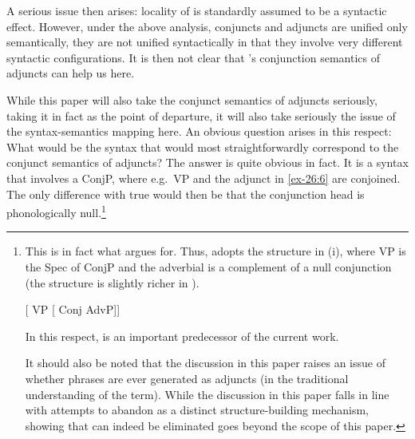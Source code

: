 \documentclass[output=paper]{langsci/langscibook}
\begin{document}
\begin{exe}
\label{ex-26:7}

\label{ex-26:8}
\end{exe}

A serious issue then arises: locality of  is standardly assumed to be a
syntactic effect. However, under the above analysis, conjuncts and adjuncts are
unified only semantically, they are not unified syntactically in that they
involve very different syntactic configurations. It is then not clear that
\citeauthor{Higginbotham1985}’s conjunction semantics of adjuncts can help us
here.

While this paper will also take the conjunct semantics of adjuncts seriously,
taking it in fact as the point of departure, it will also take seriously the
issue of the syntax-semantics mapping here. An obvious question arises in this
respect: What would be the syntax that would most straightforwardly correspond
to the conjunct semantics of adjuncts? The answer is quite obvious in fact. It
is a syntax that involves a ConjP, where e.g.\ VP and the adjunct in \eqref{ex-26:6} are
conjoined. The only difference with true  would then be that the
conjunction head is phonologically null.\footnote{This is in fact what
    \textcite{Progovac1998,Progovac1999} argues for. Thus, \citet{Progovac1998}
    adopts the structure in (i), where VP is the Spec of ConjP and the
    adverbial is a complement of a null conjunction (the structure is slightly
    richer in \citealt{Progovac1999}).

    \begin{exe}
         {}[ VP [ Conj AdvP]]
    \end{exe}

    \noindent In this respect, \textcite{Progovac1998,Progovac1999} is an important
    predecessor of the current work.

    It should also be noted that the discussion in this paper raises an issue
    of whether phrases are ever generated as adjuncts (in the traditional
    understanding of the term).  While the discussion in this paper falls in
    line with attempts to abandon  as a distinct structure-building
mechanism, showing that  can indeed be eliminated goes beyond the
scope of this paper.}
\end{document}
